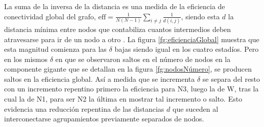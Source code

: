 \documentclass{article}
\begin{document}
La suma de la inversa de la distancia es una medida de la eficiencia de conectividad global del grafo, $\mathrm{eff} = \frac{1}{N (N-1)} \sum_{i \neq j} \frac{1}{d(i,j)}$, siendo esta $d$ la distancia mínima entre nodos que contabiliza cuantos intermedios deben atravesarse para ir de un nodo a otro \cite{ek_global_2015}.
La figura \ref{fg:eficienciaGlobal} muestra que esta magnitud comienza para las $\delta$ bajas siendo igual en los cuatro estadíos.
Pero en los mismos $\delta$ en que se observaron saltos en el número de nodos en la componente gigante que se detallan en la figura \ref{fg:nodosNúmero}, se producen saltos en la eficiencia global.
Así a medida que se incrementa $\delta$ se separa del resto con un incremento repentino primero la eficiencia para N3, luego la de W, tras la cual la de N1, para ser N2 la última en mostrar tal incremento o salto.
Esto evidencia una reducción repentina de las distancias $d$ que suceden al interconectarse agrupamientos previamente separados de nodos.
\end{document}
